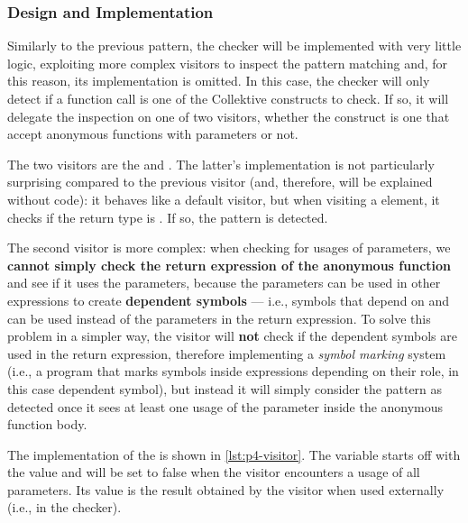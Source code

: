\documentclass[12pt,a4paper,openright,twoside]{book}
\begin{document}
\subsubsection{Design and Implementation}

Similarly to the previous pattern, the checker will be implemented with very
little logic, exploiting more complex visitors to inspect the pattern matching
and, for this reason, its implementation is omitted. In this case, the checker
will only detect if a function call is one of the Collektive constructs to
check. If so, it will delegate the inspection on one of two visitors, whether
the construct is one that accept anonymous functions with parameters or not. 

The two visitors are the  and
. The latter's implementation is not particularly
surprising compared to the previous visitor (and, therefore, will be explained
without code): it behaves like a default visitor, but when visiting a
 element, it checks if the return type is
. If so, the pattern is detected.

The second visitor is more complex: when checking for usages of parameters, we
\textbf{cannot simply check the return expression of the anonymous function} and
see if it uses the parameters, because the parameters can be used in other
expressions to create \textbf{dependent symbols} --- i.e., symbols that depend
on and can be used instead of the parameters in the return expression.
%
To solve this problem in a simpler way, the visitor will \textbf{not} check if
the dependent symbols are used in the return expression, therefore implementing
a \emph{symbol marking} system (i.e., a program that marks symbols inside
expressions depending on their role, in this case dependent symbol), but instead
it will simply consider the pattern as detected once it sees at least one usage
of the parameter inside the anonymous function body.  

The implementation of the  is shown in
\cref{lst:p4-visitor}. The variable  starts off with the value
 and will be set to false when the visitor encounters a usage of all
parameters. Its value is the result obtained by the visitor when used externally
(i.e., in the checker).


\end{document}
